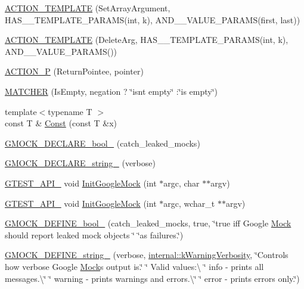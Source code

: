 \begin{DoxyCompactItemize}
\item 
\hyperlink{namespacetesting_a2b0f090219db3bb0630d5ce6f7d911d8}{A\+C\+T\+I\+O\+N\+\_\+\+T\+E\+M\+P\+L\+A\+TE} (Set\+Array\+Argument, H\+A\+S\+\_\+\_\+\+T\+E\+M\+P\+L\+A\+T\+E\+\_\+\+P\+A\+R\+A\+MS(int, k), A\+N\+D\+\_\+\_\+\+V\+A\+L\+U\+E\+\_\+\+P\+A\+R\+A\+MS(first, last))
\item 
\hyperlink{namespacetesting_a37a5ebfe68fd8dedf8bd82a5ebddcb7b}{A\+C\+T\+I\+O\+N\+\_\+\+T\+E\+M\+P\+L\+A\+TE} (Delete\+Arg, H\+A\+S\+\_\+\_\+\+T\+E\+M\+P\+L\+A\+T\+E\+\_\+\+P\+A\+R\+A\+MS(int, k), A\+N\+D\+\_\+\_\+\+V\+A\+L\+U\+E\+\_\+\+P\+A\+R\+A\+MS())
\item 
\hyperlink{namespacetesting_a3d58f0d746946064154cd257d368599d}{A\+C\+T\+I\+O\+N\+\_\+P} (Return\+Pointee, pointer)
\item 
\hyperlink{namespacetesting_a4fcb3f407119590471bea5a90a8d2dda}{M\+A\+T\+C\+H\+ER} (Is\+Empty, negation ? \char`\"{}isn\textquotesingle{}t empty\char`\"{} \+:\char`\"{}is empty\char`\"{})
\item 
{\footnotesize template$<$typename T $>$ }\\const T \& \hyperlink{namespacetesting_a945ac56c5508a3c9c032bbe8aae8dcfa}{Const} (const T \&x)
\item 
\hyperlink{namespacetesting_a9dd7591091234b86ce48ce1aff6feeb5}{G\+M\+O\+C\+K\+\_\+\+D\+E\+C\+L\+A\+R\+E\+\_\+bool\+\_\+} (catch\+\_\+leaked\+\_\+mocks)
\item 
\hyperlink{namespacetesting_a4dd099d1d538f26a16fcc2f94011b37e}{G\+M\+O\+C\+K\+\_\+\+D\+E\+C\+L\+A\+R\+E\+\_\+string\+\_\+} (verbose)
\item 
\hyperlink{gtest-port_8h_aa73be6f0ba4a7456180a94904ce17790}{G\+T\+E\+S\+T\+\_\+\+A\+P\+I\+\_\+} void \hyperlink{namespacetesting_a32b1c6db9ba5133ccabfa67616b3c041}{Init\+Google\+Mock} (int $\ast$argc, char $\ast$$\ast$argv)
\item 
\hyperlink{gtest-port_8h_aa73be6f0ba4a7456180a94904ce17790}{G\+T\+E\+S\+T\+\_\+\+A\+P\+I\+\_\+} void \hyperlink{namespacetesting_a20fb86152763dddef67bc1dd8b090800}{Init\+Google\+Mock} (int $\ast$argc, wchar\+\_\+t $\ast$$\ast$argv)
\item 
\hyperlink{namespacetesting_aca5af0e8943ba53352537ab84233b47f}{G\+M\+O\+C\+K\+\_\+\+D\+E\+F\+I\+N\+E\+\_\+bool\+\_\+} (catch\+\_\+leaked\+\_\+mocks, true, \char`\"{}true iff Google \hyperlink{classtesting_1_1_mock}{Mock} should report leaked mock objects \char`\"{} \char`\"{}as failures.\char`\"{})
\item 
\hyperlink{namespacetesting_a16c4c37462184feebef44eb45e3fd98c}{G\+M\+O\+C\+K\+\_\+\+D\+E\+F\+I\+N\+E\+\_\+string\+\_\+} (verbose, \hyperlink{namespacetesting_1_1internal_ad9386ccda6b6deac2f7b84784d3088c0}{internal\+::k\+Warning\+Verbosity}, \char`\"{}Controls how verbose Google \hyperlink{classtesting_1_1_mock}{Mock}\textquotesingle{}s output is.\char`\"{} \char`\"{}  Valid values\+:\textbackslash{} \char`\"{} info -\/ prints all messages.\textbackslash{}\char`\"{} \char`\"{} warning -\/ prints warnings and errors.\textbackslash{}\char`\"{} \char`\"{} error -\/ prints errors only.\char`\"{})

\end{DoxyCompactItemize}
